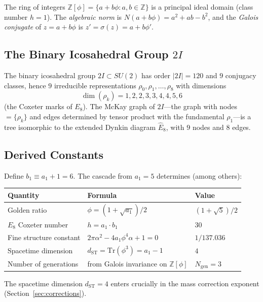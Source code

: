 \documentclass[12pt,a4paper]{article}
\theoremstyle{definition}
\begin{document}
The ring of integers $\mathbb{Z}[\phi] = \{a + b\phi : a, b \in \mathbb{Z}\}$ is a principal ideal domain (class number $h = 1$).  The \emph{algebraic norm} is $N(a + b\phi) = a^2 + ab - b^2$, and the \emph{Galois conjugate} of $z = a + b\phi$ is $z' = \sigma(z) = a + b\phi'$.

\subsection{The Binary Icosahedral Group $2I$}

The binary icosahedral group $2I \subset SU(2)$ has order $|2I| = 120$ and $9$ conjugacy classes, hence $9$ irreducible representations $\rho_0, \rho_1, \ldots, \rho_8$ with dimensions
\begin{equation}
\dim(\rho_k) = 1, 2, 2, 3, 3, 4, 4, 5, 6
\end{equation}
(the Coxeter marks of $E_8$).  The McKay graph of $2I$---the graph with nodes $= \{\rho_k\}$ and edges determined by tensor product with the fundamental $\rho_1$---is a tree isomorphic to the extended Dynkin diagram $\hat{E}_8$, with $9$ nodes and $8$ edges.

\subsection{Derived Constants}

Define $b_1 \equiv a_1 + 1 = 6$.  The cascade from $a_1 = 5$ determines (among others):
\begin{center}
\begin{tabular}{lll}
\toprule
\textbf{Quantity} & \textbf{Formula} & \textbf{Value} \\
\midrule
Golden ratio & $\phi = (1+\sqrt{a_1})/2$ & $(1+\sqrt{5})/2$ \\
$E_8$ Coxeter number & $h = a_1 \cdot b_1$ & $30$ \\
Fine structure constant & $2\pi\alpha^2 - 4a_1\phi^4\alpha + 1 = 0$ & $1/137.036$ \\
Spacetime dimension & $d_{\mathrm{ST}} = \mathrm{Tr}(\phi^3) = a_1 - 1$ & $4$ \\
Number of generations & from Galois invariance on $\mathbb{Z}[\phi]$ & $N_{\mathrm{gen}} = 3$ \\
\bottomrule
\end{tabular}
\end{center}

The spacetime dimension $d_{\mathrm{ST}} = 4$ enters crucially in the mass correction exponent (Section~\ref{sec:corrections}).
\end{document}
